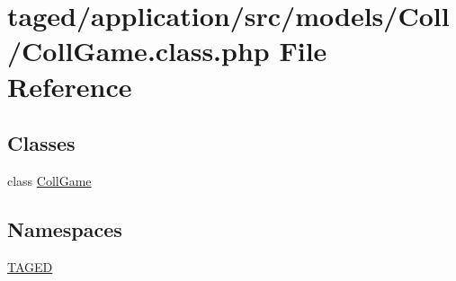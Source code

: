 \hypertarget{_coll_game_8class_8php}{}\section{taged/application/src/models/\+Coll/\+Coll\+Game.class.\+php File Reference}
\label{_coll_game_8class_8php}
\subsection*{Classes}
\begin{DoxyCompactItemize}
\item 
class \hyperlink{class_coll_game}{Coll\+Game}
\end{DoxyCompactItemize}
\subsection*{Namespaces}
\begin{DoxyCompactItemize}
\item 
 \hyperlink{namespace_t_a_g_e_d}{T\+A\+G\+ED}
\end{DoxyCompactItemize}

